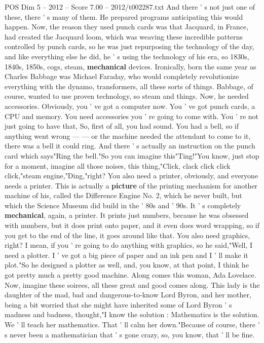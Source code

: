 \begin{textsample}{POS Dim 5 – 2012 – Score 7.00 – 2012/t002287.txt}
And there ' s not just one of these, there ' s many of them.
He prepared programs anticipating this would happen.
Now, the reason they used punch cards was that Jacquard, in France, had created the Jacquard loom, which was weaving these incredible patterns controlled by punch cards, so he was just repurposing the technology of the day, and like everything else he did, he ' s using the technology of his era, so 1830s, 1840s, 1850s, cogs, steam, \textbf{mechanical} devices.
Ironically, born the same year as Charles Babbage was Michael Faraday, who would completely revolutionize everything with the dynamo, transformers, all these sorts of things.
Babbage, of course, wanted to use proven technology, so steam and things.
Now, he needed accessories.
Obviously, you ' ve got a computer now.
You ' ve got punch cards, a CPU and memory.
You need accessories you ' re going to come with.
You ' re not just going to have that, So, first of all, you had sound.
You had a bell, so if anything went wrong — — or the machine needed the attendant to come to it, there was a bell it could ring.
And there ' s actually an instruction on the punch card which says"Ring the bell."So you can imagine this"Ting!"You know, just stop for a moment, imagine all those noises, this thing,"Click, clack click click click,"steam engine,"Ding,"right?
You also need a printer, obviously, and everyone needs a printer.
This is actually a \textbf{picture} of the printing mechanism for another machine of his, called the Difference Engine No. 2, which he never built, but which the Science Museum did build in the ' 80s and ' 90s.
It ' s completely \textbf{mechanical}, again, a printer.
It prints just numbers, because he was obsessed with numbers, but it does print onto paper, and it even does word wrapping, so if you get to the end of the line, it goes around like that.
You also need graphics, right?
I mean, if you ' re going to do anything with graphics, so he said,"Well, I need a plotter.
I ' ve got a big piece of paper and an ink pen and I ' ll make it plot."So he designed a plotter as well, and, you know, at that point, I think he got pretty much a pretty good machine.
Along comes this woman, Ada Lovelace.
Now, imagine these soirees, all these great and good comes along.
This lady is the daughter of the mad, bad and dangerous-to-know Lord Byron, and her mother, being a bit worried that she might have inherited some of Lord Byron ' s madness and badness, thought,"I know the solution : Mathematics is the solution.
We ' ll teach her mathematics.
That ' ll calm her down."Because of course, there ' s never been a mathematician that ' s gone crazy, so, you know, that ' ll be fine.

\end{textsample}
